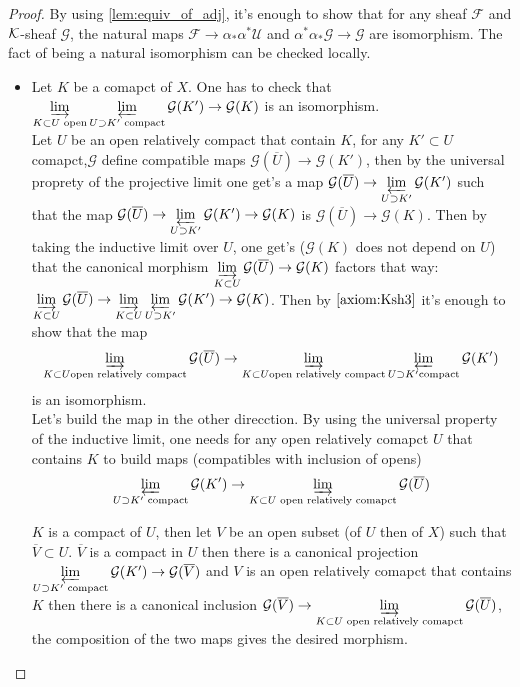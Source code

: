 \begin{proof}
    By using \ref{lem:equiv_of_adj}, it's enough to show that for any sheaf $\mathcal{F}$ and $\mathcal{K}$-sheaf $\mathcal{G}$, the natural maps $\mathcal{F}\to \alpha_*\alpha^*\mathcal{U}$ and $\alpha^*\alpha_*\mathcal{G}\to \mathcal{G}$ are isomorphism. The fact of being a natural isomorphism can be checked locally.\begin{itemize}

        \item Let $K$ be a comapct of $X$. One has to check that $\varinjlim\limits_{K\subset U \text{ open}}\varprojlim\limits_{U\supset K' \text{ compact}}\mathcal{G}(K')\to \mathcal{G}(K)$ is an isomorphism.\\

        Let $U$ be an open relatively compact that contain $K$, for any $K'\subset U$ comapct,$\mathcal{G}$ define compatible maps $\mathcal{G}(\overline{U})\to \mathcal{G}(K')$, then by the universal proprety of the projective limit one get's a map $\mathcal{G}(\overline{U})\to \varprojlim\limits_{U\supset K'}\mathcal{G}(K')$ such that the map $\mathcal{G}(\overline{U})\to \varprojlim\limits_{U\supset K'}\mathcal{G}(K')\to \mathcal{G}(K)$ is $\mathcal{G}(\overline{U})\to \mathcal{G}(K)$. Then by taking the inductive limit over $U$, one get's ($\mathcal{G}(K)$ does not depend on $U$) that the canonical morphism $\varinjlim\limits_{K\subset U}\mathcal{G}(\overline{U})\to \mathcal{G}(K)$ factors that way: $\varinjlim\limits_{K\subset U}\mathcal{G}(\overline{U})\to \varinjlim\limits_{K\subset U}\varprojlim\limits_{U\supset K'}\mathcal{G}(K')\to \mathcal{G}(K)$. Then by $\eqref{axiom:Ksh3}$ it's enough to show that the map \[\varinjlim\limits_{K\subset U \text{open relatively compact}}\mathcal{G}(\overline{U})\to \varinjlim\limits_{K\subset U \text{open relatively compact}}\varprojlim\limits_{U\supset K' \text{compact}}\mathcal{G}(K')\] is an isomorphism.\\
        
        Let's build the map in the other direcction. By using the universal property of the inductive limit, one needs for any open relatively comapct $U$ that contains $K$ to build maps (compatibles with inclusion of opens) \[\varprojlim\limits_{U\supset K' \text{ compact}}\mathcal{G}(K')\to \varinjlim\limits_{K\subset U \text{ open relatively comapct}}\mathcal{G}(\overline{U})\]

        $K$ is a compact of $U$, then let $V$ be an open subset (of $U$ then of $X$) such that $\overline{V}\subset U$. $\overline{V}$ is a compact in $U$ then there is a canonical projection $\varprojlim\limits_{U\supset K' \text{ compact}}\mathcal{G}(K')\to \mathcal{G}(\overline{V})$ and $V$ is an open relatively comapct that contains $K$ then there is a canonical inclusion $\mathcal{G}(\overline{V})\to \varinjlim\limits_{K\subset U \text{ open relatively comapct}}\mathcal{G}(\overline{U})$, the composition of the two maps gives the desired morphism.\\


\end{itemize}
\end{proof}
